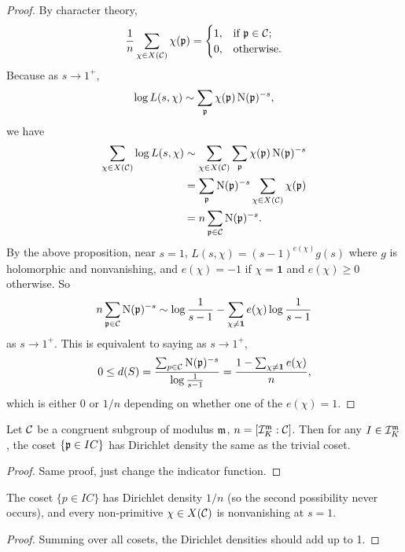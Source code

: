 \documentclass[11pt]{amsart}
\begin{document}
\begin{proof}
    By character theory,
    \[\frac{1}{n} \sum_{\chi\in X(\mathcal{C})} \chi(\mathfrak{p}) = \begin{cases}
    1, & \text{if }
    \mathfrak{p} \in \mathcal{C}; \\
    0, & \text{otherwise.}
    \end{cases}\]
    Because as $s\to 1^+$,
    \[
    \log L(s,\chi) \sim \sum_{\mathfrak{p}} \chi(\mathfrak{p})\operatorname{N}(\mathfrak{p})^{-s},
    \]
    we have
    \begin{align*}
        \sum_{\chi\in X(\mathcal{C})} \log L(s,\chi) 
        &\sim \sum_{\chi\in X(\mathcal{C})} \sum_{\mathfrak{p}} \chi(\mathfrak{p})\operatorname{N}(\mathfrak{p})^{-s} \\
        &= \sum_{\mathfrak{p}} \operatorname{N}(\mathfrak{p})^{-s} \sum_{\chi\in X(\mathcal{C})} \chi(\mathfrak{p}) \\
        &= n\sum_{\mathfrak{p}\in \mathcal{C}} \operatorname{N}(\mathfrak{p})^{-s}.
    \end{align*}
    By the above proposition, near $s=1$, $L(s,\chi) = (s-1)^{e(\chi)}g(s)$ where $g$ is holomorphic and nonvanishing, and $e(\chi) = -1$ if $\chi = \mathbf{1}$ and $e(\chi) \ge 0$ otherwise. So
    \[n\sum_{\mathfrak{p}\in \mathcal{C}}\operatorname{N}(\mathfrak{p})^{-s} \sim \log  \frac{1}{s-1} - \sum_{\chi\neq \mathbf{1}} e(\chi)\log\frac{1}{s-1}\]
    as $s\to 1^+$. This is equivalent to saying as $s\to 1^+$,
    \[0\le d(S) = \frac{\sum_{p\in \mathcal{C}} \operatorname{N}(\mathfrak{p})^{-s}}{\log \frac{1}{s-1}} = \frac{1 - \sum_{\chi\neq \mathbf{1}} e(\chi)}{n},\]
    which is either 0 or $1/n$ depending on whether one of the $e(\chi) = 1$.
\end{proof}


\begin{prop}
    Let $\mathcal{C}$ be a congruent subgroup of modulus $\mathfrak{m}$, $n = [\mathcal{I}_K^{\mathfrak{m}}: \mathcal{C}]$. Then for any $I\in \mathcal{I}_K^{\mathfrak{m}}$, the coset $\{\mathfrak{p}\in IC\}$ has Dirichlet density the same as the trivial coset.
\end{prop}

\begin{proof}
    Same proof, just change the indicator function.
\end{proof}

\begin{cor}
    The coset $\{p\in IC\}$ has Dirichlet density $1/n$ (so the second possibility never occurs), and every non-primitive $\chi \in X(\mathcal{C})$ is nonvanishing at $s=1$.
\end{cor}

\begin{proof}
    Summing over all cosets, the Dirichlet densities should add up to 1.
\end{proof}
\end{document}
